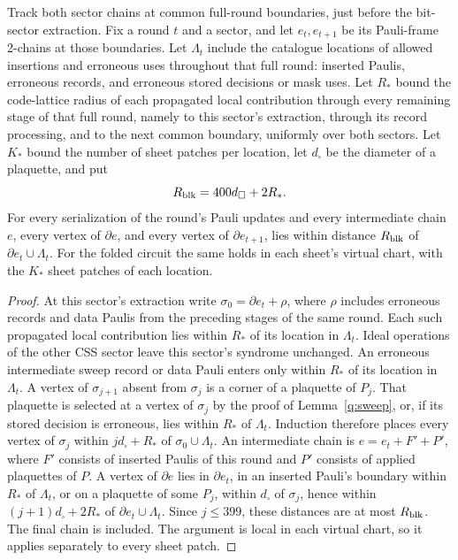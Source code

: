 \begin{lemma}\label{q:round-shadow}
Track both sector chains at common full-round boundaries, just before
the bit-sector extraction. Fix a round \(t\) and a sector, and let
\(e_t,e_{t+1}\) be its Pauli-frame 2-chains at those boundaries.
Let \(\Lambda_t\) include the catalogue locations of allowed insertions
and erroneous uses throughout that full round: inserted Paulis,
erroneous records, and erroneous stored decisions or mask uses.
Let \(R_*\) bound the code-lattice radius of each propagated local
contribution through every remaining stage of that full round, namely
to this sector's extraction, through its record processing, and to the
next common boundary, uniformly over both sectors.
Let \(K_*\) bound the number of sheet patches per location, let
\(d_\square\) be the diameter of a plaquette, and put
\[
 R_{\rm blk}=400d_\square+2R_*.
\]
For every serialization of the round's Pauli updates and every
intermediate chain \(e\), every vertex of \(\partial e\), and every
vertex of \(\partial e_{t+1}\), lies within distance \(R_{\rm blk}\)
of \(\partial e_t\cup\Lambda_t\). For the folded circuit the same
holds in each sheet's virtual chart, with the \(K_*\) sheet patches
of each location.
\end{lemma}
\begin{proof}
At this sector's extraction write \(\sigma_0=\partial e_t+\rho\),
where \(\rho\) includes erroneous records and data Paulis from the
preceding stages of the same round. Each such propagated local
contribution lies within \(R_*\) of its location in \(\Lambda_t\).
Ideal operations of the other CSS sector leave this sector's syndrome
unchanged. An erroneous intermediate sweep record or data Pauli
enters only within \(R_*\) of its location in \(\Lambda_t\).
A vertex of
\(\sigma_{j+1}\) absent from \(\sigma_j\) is a corner of a plaquette
of \(P_j\). That plaquette is selected at a vertex of \(\sigma_j\)
by the proof of Lemma~\ref{q:sweep}, or, if its stored decision is
erroneous, lies within \(R_*\) of \(\Lambda_t\). Induction therefore
places every vertex of \(\sigma_j\) within \(jd_\square+R_*\) of
\(\sigma_0\cup\Lambda_t\). An intermediate chain is
\(e=e_t+F'+P'\), where \(F'\) consists of inserted Paulis of this
round and \(P'\) consists of applied plaquettes of \(P\). A vertex
of \(\partial e\) lies in \(\partial e_t\), in an inserted Pauli's
boundary within \(R_*\) of \(\Lambda_t\), or on a plaquette of
some \(P_j\), within \(d_\square\) of \(\sigma_j\), hence within
\((j+1)d_\square+2R_*\) of \(\partial e_t\cup\Lambda_t\). Since
\(j\le399\), these distances are at most \(R_{\rm blk}\).
The final chain is included. The argument is local in each virtual
chart, so it applies separately to every sheet patch.
\end{proof}

